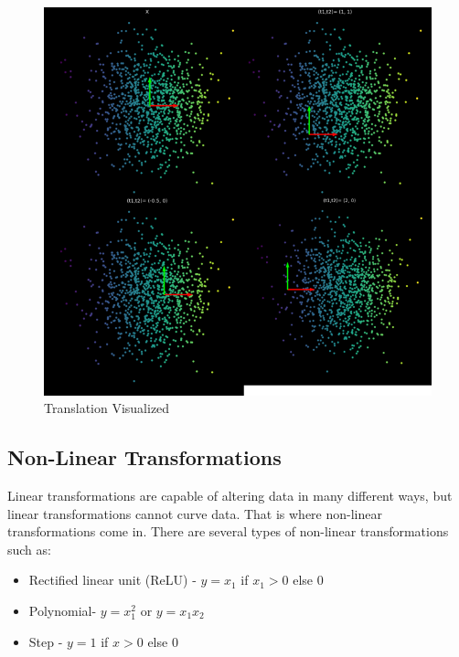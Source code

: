 \begin{figure}[h!]
\begin{center}
\includegraphics{labs/01/images/translation.png}
\end{center} 
\caption{Translation Visualized}
\label{fig:mon}
\end{figure}

\subsection{Non-Linear Transformations}
Linear transformations are capable of altering data in many different ways, but linear transformations cannot curve data. 
That is where non-linear transformations come in. There are several types of non-linear transformations such as:

\begin{itemize}
\item
Rectified linear unit (ReLU) - \(y = x_1\) if \(x_1 > 0\) else $0$ 
\item
Polynomial- \(y = x_1^2\) or \(y = x_1 x_2\)
\item
Step - \(y = 1\) if \(x > 0 \) else $0$ 

\end{itemize}

